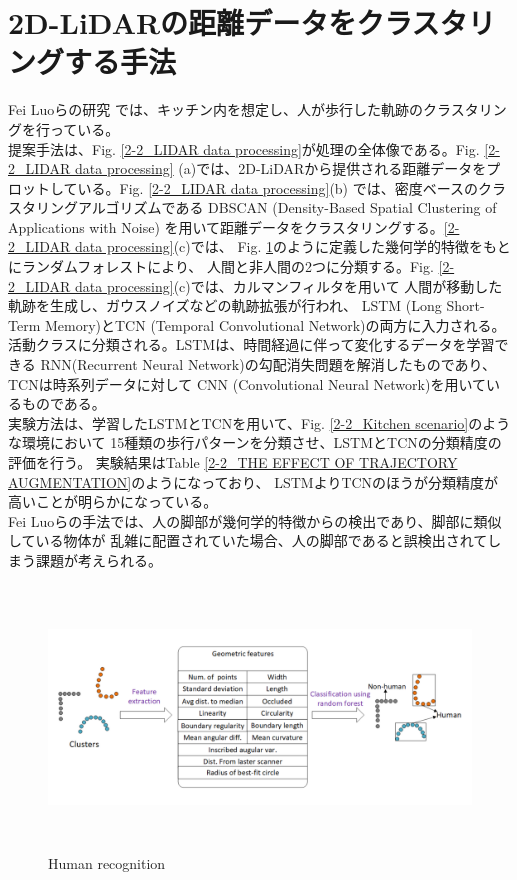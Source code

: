 \section{2D-LiDARの距離データをクラスタリングする手法}
Fei Luoらの研究\cite{Temporal convolutional networks for multi-person activity recognition using a 2D LIDAR}
では、キッチン内を想定し、人が歩行した軌跡のクラスタリングを行っている。\\ \indent
提案手法は、Fig. \ref{2-2_LIDAR data processing}が処理の全体像である。Fig. \ref{2-2_LIDAR data processing}
(a)では、2D-LiDARから提供される距離データをプロットしている。Fig. \ref{2-2_LIDAR data processing}(b)
では、密度ベースのクラスタリングアルゴリズムである
DBSCAN (Density-Based Spatial Clustering of Applications with Noise)
を用いて距離データをクラスタリングする。\ref{2-2_LIDAR data processing}(c)では、
Fig. \ref{2-2_Human recognition}のように定義した幾何学的特徴をもとにランダムフォレストにより、
人間と非人間の2つに分類する。Fig. \ref{2-2_LIDAR data processing}(c)では、カルマンフィルタを用いて
人間が移動した軌跡を生成し、ガウスノイズなどの軌跡拡張が行われ、
LSTM (Long Short-Term Memory)とTCN (Temporal Convolutional Network)の両方に入力される。
活動クラスに分類される。LSTMは、時間経過に伴って変化するデータを学習できる
RNN(Recurrent Neural Network)の勾配消失問題を解消したものであり、TCNは時系列データに対して
CNN (Convolutional Neural Network)を用いているものである。\\ \indent
実験方法は、学習したLSTMとTCNを用いて、Fig. \ref{2-2_Kitchen scenario}のような環境において
15種類の歩行パターンを分類させ、LSTMとTCNの分類精度の評価を行う。
実験結果はTable \ref{2-2_THE EFFECT OF TRAJECTORY AUGMENTATION}のようになっており、
LSTMよりTCNのほうが分類精度が高いことが明らかになっている。\\ \indent
Fei Luoらの手法では、人の脚部が幾何学的特徴からの検出であり、脚部に類似している物体が
乱雑に配置されていた場合、人の脚部であると誤検出されてしまう課題が考えられる。

\begin{figure}[h]
  \begin{center}
  \includegraphics[height=70mm,clip]{figure/2-2_Human-recognition.png}
  \caption{Human recognition\cite{Temporal convolutional networks for multi-person activity recognition using a 2D LIDAR}}
  \label{2-2_Human recognition}
  \end{center}
\end{figure}

